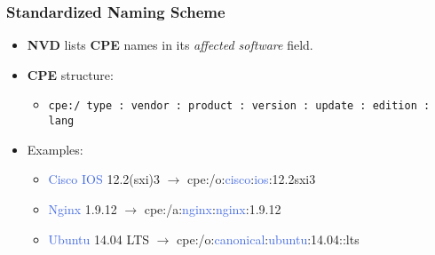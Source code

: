 \documentclass[aspectratio=169,xcolor={usenames,dvipsnames}]{beamer}
\newcommand{\ispace}{\vspace{10pt}}
\begin{document}
\begin{frame}
	\frametitle{Standardized Naming Scheme}
	
	\begin{itemize}
		\item \textbf{NVD} lists \textbf{CPE} names in its \textit{affected software} field.
	\end{itemize}
	
	\ispace
	
	\begin{itemize}
		\item \textbf{CPE} structure:
		\begin{itemize}
			\item[] \hspace{-18.2pt} \texttt{cpe:/ type : vendor : product : version : update : edition : lang}
		\end{itemize}
	\end{itemize}
	
	\ispace
	
	\begin{itemize}
		\item Examples:
		\begin{itemize}
			\item \textcolor{RoyalBlue}{Cisco IOS} \textcolor{OliveGreen}{12.2(sxi)3} \hspace{5pt}$\rightarrow$\hspace{5pt} cpe:/o:\textcolor{RoyalBlue}{cisco}:\textcolor{RoyalBlue}{ios}:\textcolor{OliveGreen}{12.2sxi3}
			\item \textcolor{RoyalBlue}{Nginx} \textcolor{OliveGreen}{1.9.12} \hspace{34.5pt} $\rightarrow$\hspace{5pt} cpe:/a:\textcolor{RoyalBlue}{nginx}:\textcolor{RoyalBlue}{nginx}:\textcolor{OliveGreen}{1.9.12}
			\item \textcolor{RoyalBlue}{Ubuntu} \textcolor{OliveGreen}{14.04} \textcolor{BurntOrange}{LTS} \hspace{10pt} $\rightarrow$\hspace{5pt} cpe:/o:\textcolor{RoyalBlue}{canonical}:\textcolor{RoyalBlue}{ubuntu}:\textcolor{OliveGreen}{14.04}::\textcolor{BurntOrange}{lts}
		\end{itemize}
	\end{itemize}
\end{frame}
\end{document}
